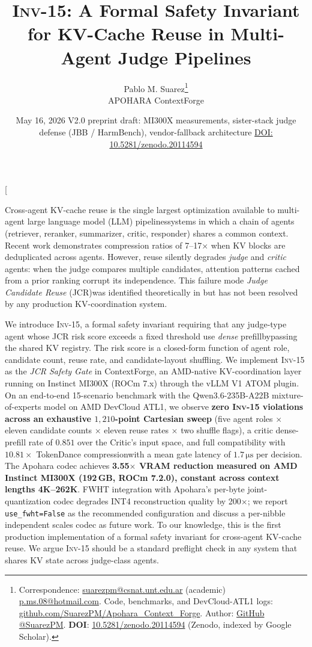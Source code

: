 \documentclass[10pt,twocolumn]{article}
\title{\textbf{\textsc{Inv-15}}: A Formal Safety Invariant for KV-Cache
       Reuse in Multi-Agent Judge Pipelines}
\author{Pablo M. Suarez\thanks{Correspondence:
        \href{mailto:suarezpm@csnat.unt.edu.ar}{suarezpm@csnat.unt.edu.ar}
        (academic) \textperiodcentered{}
        \href{mailto:p.ms.08@hotmail.com}{p.ms.08@hotmail.com}.
        Code, benchmarks, and DevCloud-ATL1 logs:
        \href{https://github.com/SuarezPM/Apohara\_Context\_Forge}%
             {github.com/SuarezPM/Apohara\_Context\_Forge}.
        Author: \href{https://github.com/SuarezPM}{GitHub @SuarezPM}.
        \textbf{DOI}: \href{https://doi.org/10.5281/zenodo.20114594}%
             {10.5281/zenodo.20114594} (Zenodo, indexed by Google Scholar).}\\
        APOHARA \textperiodcentered{} ContextForge}
\date{May 16, 2026 \textperiodcentered{} V2.0 preprint draft: MI300X measurements,
      sister-stack judge defense (JBB / HarmBench), vendor-fallback architecture
      \textperiodcentered{}
      \href{https://doi.org/10.5281/zenodo.20114594}%
           {DOI: 10.5281/zenodo.20114594}}
\newcommand{\INV}[1]{\textsc{Inv-#1}}
\begin{document}
\twocolumn[
  \maketitle
  \begin{onecolabstract}
    \noindent
    Cross-agent KV-cache reuse is the single largest optimization available to
    multi-agent large language model (LLM) pipelines\textemdash systems in
    which a chain of agents (retriever, reranker, summarizer, critic,
    responder) shares a common context. Recent work
    \cite{kvcomm,tokendance,lmcache} demonstrates compression ratios of
    7--17$\times$ when KV blocks are deduplicated across agents. However,
    reuse silently degrades \emph{judge} and \emph{critic} agents: when the
    judge compares multiple candidates, attention patterns cached from a
    prior ranking corrupt its independence. This failure mode\textemdash
    \emph{Judge Candidate Reuse} (JCR)\textemdash was identified
    theoretically in \cite{jcrfailure} but has not been resolved by any
    production KV-coordination system.

    We introduce \INV{15}, a formal safety invariant requiring that any
    judge-type agent whose JCR risk score exceeds a fixed threshold use
    \emph{dense} prefill\textemdash bypassing the shared KV registry. The risk
    score is a closed-form function of agent role, candidate count, reuse
    rate, and candidate-layout shuffling. We implement \INV{15} as the
    \emph{JCR Safety Gate} in ContextForge, an AMD-native KV-coordination
    layer running on Instinct MI300X (ROCm 7.x) through the vLLM V1 ATOM
    plugin. On an end-to-end 15-scenario benchmark with the
    Qwen3.6-235B-A22B mixture-of-experts model on AMD DevCloud ATL1, we
    observe \textbf{zero \INV{15} violations across an exhaustive
    $1{,}210$-point Cartesian sweep} (five agent roles $\times$ eleven
    candidate counts $\times$ eleven reuse rates $\times$ two shuffle
    flags), a critic dense-prefill rate of $0.851$ over the Critic's
    input space, and full compatibility with $10.81\times$ TokenDance
    compression\textemdash with a mean gate latency of $1.7\,\mathrm{\mu s}$
    per decision. The Apohara codec achieves
    \textbf{3.55$\times$ VRAM reduction measured on AMD Instinct MI300X
    (192\,GB, ROCm 7.2.0), constant across context lengths 4K--262K}.
    FWHT integration with Apohara's per-byte joint-quantization codec
    degrades INT4 reconstruction quality by 200$\times$; we report
    \texttt{use\_fwht=False} as the recommended configuration and discuss
    a per-nibble independent scales codec as future work.
    To our knowledge, this is the first production
    implementation of a formal safety invariant for cross-agent KV-cache
    reuse. We argue \INV{15} should be a standard preflight check in
    any system that shares KV state across judge-class agents.


\end{onecolabstract}
\end{document}
